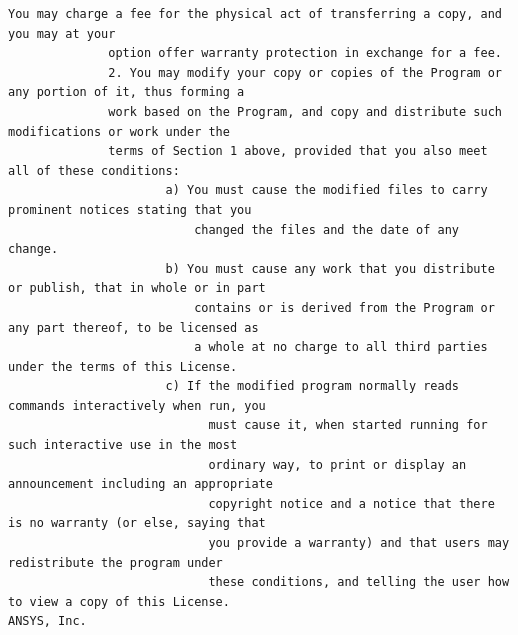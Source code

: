 \begin{lstlisting}[basicstyle=\ttfamily\scriptsize,breaklines=true]
              You may charge a fee for the physical act of transferring a copy, and you may at your
              option offer warranty protection in exchange for a fee.
              2. You may modify your copy or copies of the Program or any portion of it, thus forming a
              work based on the Program, and copy and distribute such modifications or work under the
              terms of Section 1 above, provided that you also meet all of these conditions:
                      a) You must cause the modified files to carry prominent notices stating that you
                          changed the files and the date of any change.
                      b) You must cause any work that you distribute or publish, that in whole or in part
                          contains or is derived from the Program or any part thereof, to be licensed as
                          a whole at no charge to all third parties under the terms of this License.
                      c) If the modified program normally reads commands interactively when run, you
                            must cause it, when started running for such interactive use in the most
                            ordinary way, to print or display an announcement including an appropriate
                            copyright notice and a notice that there is no warranty (or else, saying that
                            you provide a warranty) and that users may redistribute the program under
                            these conditions, and telling the user how to view a copy of this License.
ANSYS, Inc.


\end{lstlisting}
